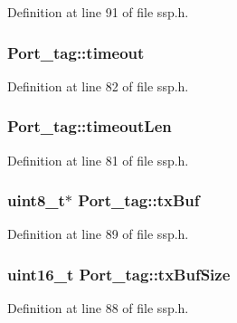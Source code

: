 Definition at line 91 of file ssp.\-h.

\hypertarget{struct_port__tag_a1429dc9140577fa5d31205c4a51ce6f7}{
\subsubsection[{timeout}]{ Port\-\_\-tag\-::timeout}}\label{struct_port__tag_a1429dc9140577fa5d31205c4a51ce6f7}


Definition at line 82 of file ssp.\-h.

\hypertarget{struct_port__tag_a30b430b0873e01809b763b0df92e62aa}{
\subsubsection[{timeout\-Len}]{ Port\-\_\-tag\-::timeout\-Len}}\label{struct_port__tag_a30b430b0873e01809b763b0df92e62aa}


Definition at line 81 of file ssp.\-h.

\hypertarget{struct_port__tag_ad1f74dda7ace34ad1709c12bce475f29}{
\subsubsection[{tx\-Buf}]{\setlength{\rightskip}{0pt plus 5cm}uint8\-\_\-t$\ast$ Port\-\_\-tag\-::tx\-Buf}}\label{struct_port__tag_ad1f74dda7ace34ad1709c12bce475f29}


Definition at line 89 of file ssp.\-h.

\hypertarget{struct_port__tag_a42ed18a051e755953a8c5fab0542428d}{
\subsubsection[{tx\-Buf\-Size}]{\setlength{\rightskip}{0pt plus 5cm}uint16\-\_\-t Port\-\_\-tag\-::tx\-Buf\-Size}}\label{struct_port__tag_a42ed18a051e755953a8c5fab0542428d}


Definition at line 88 of file ssp.\-h.

